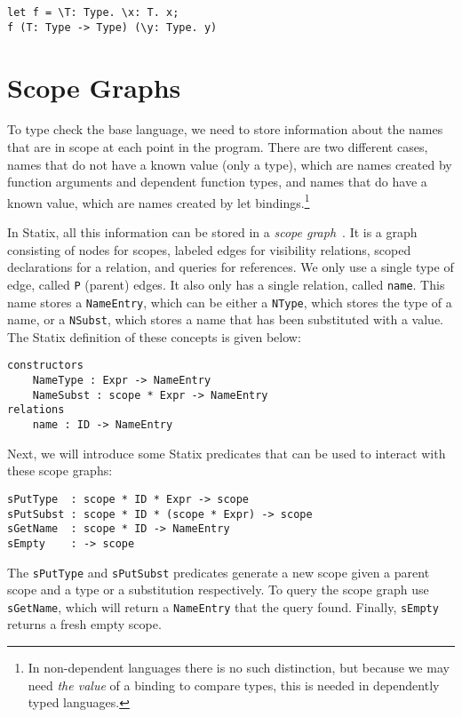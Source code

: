 \begin{lstlisting}
let f = \T: Type. \x: T. x;
f (T: Type -> Type) (\y: Type. y)
\end{lstlisting}

\section{Scope Graphs}
\label{sec:coc-scopes}

To type check the base language, we need to store information about the names that are in scope at each point in the program. There are two different cases, names that do not have a known value (only a type), which are names created by function arguments and dependent function types, and names that do have a known value, which are names created by let bindings.\footnote{In non-dependent languages there is no such distinction, but because we may need \emph{the value} of a binding to compare types, this is needed in dependently typed languages.}

In Statix, all this information can be stored in a \emph{scope graph}~\cite{scope_graphs}. It is a graph consisting of nodes for scopes, labeled edges for visibility relations, scoped declarations for a relation, and queries for references. We only use a single type of edge, called \verb|P| (parent) edges. It also only has a single relation, called \verb|name|. This name stores a \verb|NameEntry|, which can be either a \verb|NType|, which stores the type of a name, or a \verb|NSubst|, which stores a name that has been substituted with a value. The Statix definition of these concepts is given below:
\begin{lstlisting}
constructors
    NameType : Expr -> NameEntry
    NameSubst : scope * Expr -> NameEntry
relations
    name : ID -> NameEntry
\end{lstlisting}

Next, we will introduce some Statix predicates that can be used to interact with these scope graphs:

\begin{lstlisting}
sPutType  : scope * ID * Expr -> scope
sPutSubst : scope * ID * (scope * Expr) -> scope
sGetName  : scope * ID -> NameEntry
sEmpty    : -> scope
\end{lstlisting}
The \verb|sPutType| and \verb|sPutSubst| predicates generate a new scope given a parent scope and a type or a substitution respectively. To query the scope graph use \verb|sGetName|, which will return a \verb|NameEntry| that the query found. Finally, \verb|sEmpty| returns a fresh empty scope.

